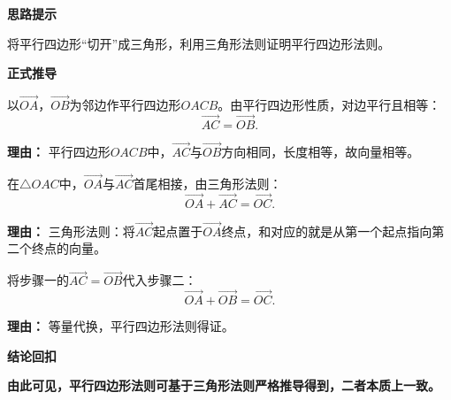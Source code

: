 \begin{proofbox}
	\textbf{\textcolor{CProof}{思路提示}}

	将平行四边形“切开”成三角形，利用三角形法则证明平行四边形法则。

	\medskip
	\textbf{\textcolor{CProof}{正式推导}}
	\begin{description}[style=nextline, leftmargin=2.8em, labelsep=0.5em, itemsep=0.55em]
		\item[\textbf{步骤一（构造平行四边形）：}] 以$\overrightarrow{OA}$，$\overrightarrow{OB}$为邻边作平行四边形$OACB$。由平行四边形性质，对边平行且相等：
			\[
				\overrightarrow{AC} = \overrightarrow{OB}.
			\]
			\par\textbf{理由：}
			平行四边形$OACB$中，$\overrightarrow{AC}$与$\overrightarrow{OB}$方向相同，长度相等，故向量相等。

		\item[\textbf{步骤二（应用三角形法则）：}] 在$\triangle OAC$中，$\overrightarrow{OA}$与$\overrightarrow{AC}$首尾相接，由三角形法则：
			\[
				\overrightarrow{OA} + \overrightarrow{AC} = \overrightarrow{OC}.
			\]
			\par\textbf{理由：}
			三角形法则：将$\overrightarrow{AC}$起点置于$\overrightarrow{OA}$终点，和对应的就是从第一个起点指向第二个终点的向量。

		\item[\textbf{步骤三（代换得结论）：}] 将步骤一的$\overrightarrow{AC}=\overrightarrow{OB}$代入步骤二：
			\[
				\overrightarrow{OA} + \overrightarrow{OB} = \overrightarrow{OC}.
			\]
			\par\textbf{理由：}
			等量代换，平行四边形法则得证。
	\end{description}

	\medskip
	\textbf{\textcolor{CProof}{结论回扣}}

	\textbf{由此可见，平行四边形法则可基于三角形法则严格推导得到，二者本质上一致。}
\end{proofbox}
